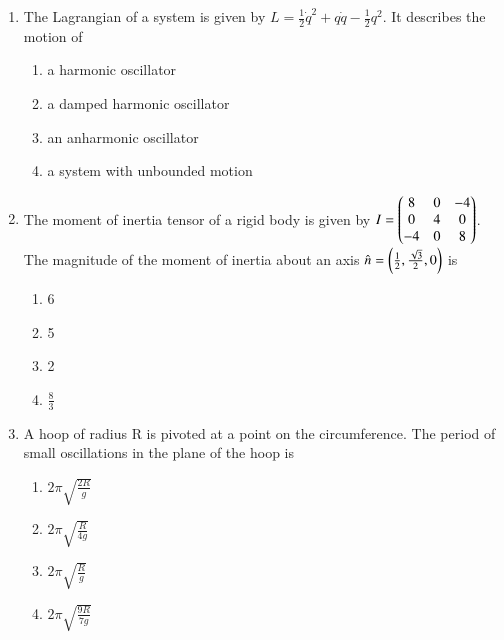 \documentclass[journal]{IEEEtran}
\begin{document}
\begin{enumerate}
    \item The Lagrangian of a system is given by $L=\frac{1}{2}\dot{q}^2+q\dot{q}-\frac{1}{2}q^2$. It describes the motion of

        \begin{multicols}{2}
            \begin{enumerate}
                \item a harmonic oscillator
                \item a damped harmonic oscillator
                \item an anharmonic oscillator
                \item a system with unbounded motion
            \end{enumerate}
        \end{multicols}
        
    \item The moment of inertia tensor of a rigid body is given by $I=\begin{pmatrix}8&0&-4\\0&4&0\\-4&0&8\end{pmatrix}$. The magnitude of the moment of inertia about an axis $\hat{n}=\left(\frac{1}{2},\frac{\sqrt{3}}{2},0\right)$ is

        \begin{multicols}{4}
            \begin{enumerate}
                \item 6
                \item 5
                \item 2
                \item $\frac{8}{3}$
            \end{enumerate}
        \end{multicols}

    \item A hoop of radius R is pivoted at a point on the circumference. The period of small oscillations in the plane of the hoop is 

        \begin{multicols}{4}
            \begin{enumerate}
                \item $2\pi\sqrt{\frac{2R}{g}}$
                \item $2\pi\sqrt{\frac{R}{4g}}$
                \item $2\pi\sqrt{\frac{R}{g}}$
                \item $2\pi\sqrt{\frac{9R}{7g}}$
            \end{enumerate}
        \end{multicols}
        

\end{enumerate}
\end{document}
